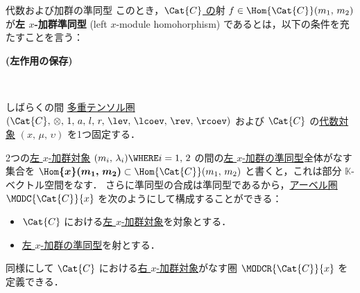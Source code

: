 \documentclass[TQFT_main]{subfiles}
\begin{document}
\begin{mydef}[label=def:hom-algmod]{代数および加群の準同型}
        このとき，\underline{$\Cat{C}$ の}射 $f \in \Hom{\Cat{C}} (m_1,\, m_2)$ が\textbf{左 $x$-加群準同型} (left $x$-module homohorphism) であるとは，以下の条件を充たすことを言う：

        \begin{description}
            \item[\textbf{(左作用の保存)}]　
            
            \begin{center}
            \end{center}
            
        \end{description}
\end{mydef}

しばらくの間 \hyperref[def:tensorfusion-cat]{多重テンソル圏} $(\Cat{C},\, \otimes,\, 1,\, a,\, l,\, r,\, \lev,\, \lcoev,\, \rev,\, \rcoev)$ および $\Cat{C}$ の\hyperref[def:algobj]{代数対象} $(x,\, \mu,\, \upsilon)$ を1つ固定する．

2つの\hyperref[def:moduleobj]{左 $x$-加群対象} $(m_i,\, \lambda_i) \WHERE i = 1,\, 2$ の間の\hyperref[def:hom-algmod]{左 $x$-加群の準同型}全体がなす集合を $\bm{\Hom{x}(m_1,\, m_2)} \subset \Hom{\Cat{C}} (m_1,\, m_2)$ と書くと，これは部分 $\mathbb{K}$-ベクトル空間をなす．
さらに準同型の合成は準同型であるから，\hyperref[def:additive-cat]{アーベル圏} $\MODC{\Cat{C}}{x}$ を次のようにして構成することができる：
\begin{itemize}
    \item $\Cat{C}$ における\hyperref[def:moduleobj]{左 $x$-加群対象}を対象とする．
    \item \hyperref[def:hom-algmod]{左 $x$-加群の準同型}を射とする．
\end{itemize}
同様にして $\Cat{C}$ における\hyperref[def:moduleobj]{右 $x$-加群対象}がなす圏 $\MODCR{\Cat{C}}{x}$ を定義できる．
\end{document}
